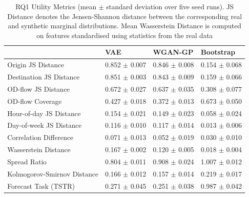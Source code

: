 \begin{table}[ht]
\centering
\begin{tabular}{llll}
\toprule
 & VAE & WGAN-GP & Bootstrap \\
\midrule
Origin JS Distance & 0.852 $\pm$ 0.007 & 0.846 $\pm$ 0.008 & 0.154 $\pm$ 0.068 \\
Destination JS Distance & 0.851 $\pm$ 0.003 & 0.843 $\pm$ 0.009 & 0.159 $\pm$ 0.066 \\
OD-flow JS Distance & 0.672 $\pm$ 0.027 & 0.637 $\pm$ 0.035 & 0.308 $\pm$ 0.077 \\
OD-flow Coverage & 0.427 $\pm$ 0.018 & 0.372 $\pm$ 0.013 & 0.673 $\pm$ 0.050 \\
Hour-of-day JS Distance & 0.154 $\pm$ 0.021 & 0.149 $\pm$ 0.023 & 0.058 $\pm$ 0.024 \\
Day-of-week JS Distance & 0.116 $\pm$ 0.010 & 0.117 $\pm$ 0.014 & 0.013 $\pm$ 0.006 \\
Correlation Difference & 0.071 $\pm$ 0.013 & 0.052 $\pm$ 0.019 & 0.030 $\pm$ 0.010 \\
Wasserstein Distance & 0.167 $\pm$ 0.002 & 0.120 $\pm$ 0.005 & 0.018 $\pm$ 0.004 \\
Spread Ratio & 0.804 $\pm$ 0.011 & 0.908 $\pm$ 0.024 & 1.007 $\pm$ 0.012 \\
Kolmogorov-Smirnov Distance & 0.166 $\pm$ 0.012 & 0.157 $\pm$ 0.014 & 0.219 $\pm$ 0.017 \\
Forecast Task (TSTR) & 0.271 $\pm$ 0.045 & 0.251 $\pm$ 0.038 & 0.987 $\pm$ 0.042 \\
\bottomrule
\end{tabular}
\caption{RQ1 Utility Metrics (mean $\pm$ standard deviation over five seed runs). JS Distance denotes the Jensen-Shannon distance between the corresponding real and synthetic marginal distributions. Mean Wasserstein Distance is computed on features standardised using statistics from the real data}
\label{tab:rq1_utility}
\end{table}
